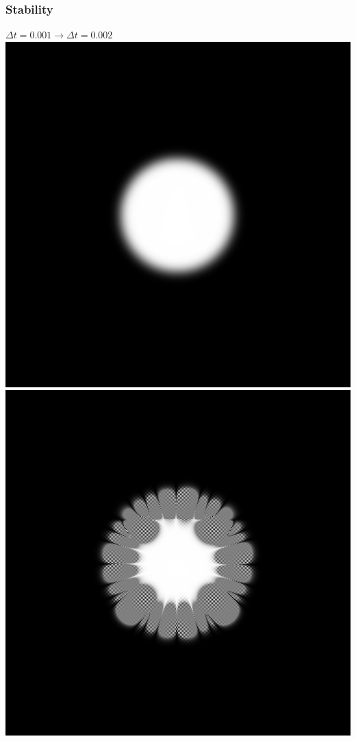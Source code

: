 \begin{frame}
\frametitle{Stability}
\begin{center}
$\Delta t = 0.001 \longrightarrow \Delta t = 0.002$
\includegraphics[scale=0.27]{../check/stable_001.png}
\includegraphics[scale=0.27]{../check/unstable_002.png}
\end{center}
\end{frame}

